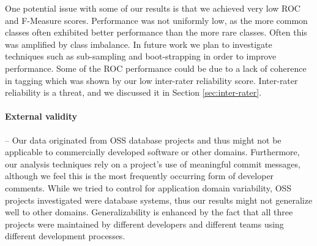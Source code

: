 \documentclass[smallextended]{svjour3}       %
\begin{document}
One potential issue with some of our results is that we achieved very
low ROC and F-Measure scores.  Performance was not uniformly low,
as the more common classes often exhibited better performance than the
more rare classes.  Often this was amplified by class imbalance. In
future work we plan to investigate techniques such as sub-sampling and
boot-strapping in order to improve performance. Some of the ROC
performance could be due to a lack of coherence in tagging which was
shown by our low inter-rater reliability score. Inter-rater reliability is a threat, and we discussed it in Section \ref{sec:inter-rater}. 



\paragraph{External validity} -- %
Our data originated from OSS database projects and thus might not be applicable to commercially developed software or other domains. 
Furthermore, our analysis techniques rely on a project's use of meaningful commit messages, although we feel this is the most frequently occurring form
of developer comments. 
While we tried to control for application domain variability, OSS
projects investigated were database systems, thus our results might
not generalize well to other domains. Generalizability is enhanced by
the fact that all three projects
were maintained by different developers and different teams using
different development processes.
\end{document}
